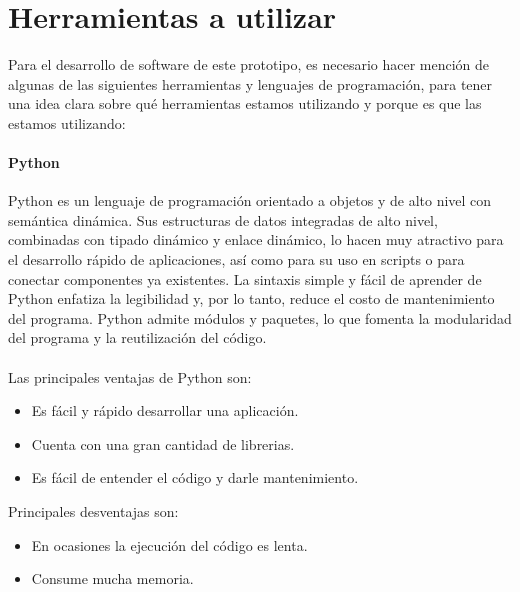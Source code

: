 \documentclass[12pt, a4paper, titlepage]{report}
\begin{document}
	   	\section{Herramientas a utilizar}
	   	Para el desarrollo de software de este prototipo, es necesario hacer mención de algunas de las siguientes herramientas y lenguajes de programación, para tener una idea clara sobre qué herramientas estamos utilizando y porque es que las estamos utilizando:
	   	\paragraph{Python \\}
	   	Python es un lenguaje de programación orientado a objetos y de alto nivel con semántica dinámica. Sus estructuras de datos integradas de alto nivel, combinadas con tipado dinámico y enlace dinámico, lo hacen muy atractivo para el desarrollo rápido de aplicaciones, así como para su uso en scripts o para conectar componentes ya existentes. La sintaxis simple y fácil de aprender de Python enfatiza la legibilidad y, por lo tanto, reduce el costo de mantenimiento del programa. Python admite módulos y paquetes, lo que fomenta la modularidad del programa y la reutilización del código.\cite{refQuesPython}\\\\
	   	Las principales ventajas de Python son: 
	   	\begin{itemize}
	   		\item Es fácil y rápido desarrollar una aplicación.
	   		\item Cuenta con una gran cantidad de librerias.
	   		\item Es fácil de entender el código y darle mantenimiento.
	   	\end{itemize}
	   	
	   	Principales desventajas son: 
	   	\begin{itemize}
	   		\item En ocasiones la ejecución del código es lenta.
	   		\item Consume mucha memoria.
	   	\end{itemize}
\end{document}
